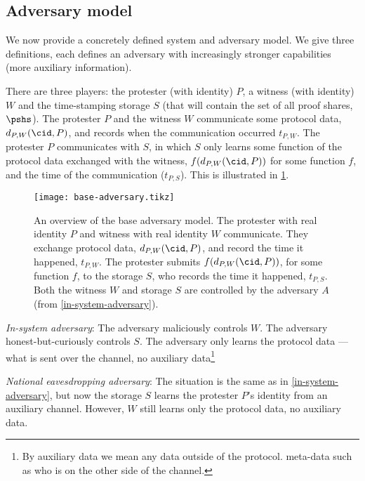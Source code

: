 \subsection{Adversary model}%
\label{formal-adversary-model}

We now provide a concretely defined system and adversary model.
We give three definitions, each defines an adversary with increasingly stronger 
capabilities (\ie more auxiliary information).

There are three players: the protester (with identity) \(P\), a witness (with 
identity) \(W\) and the time-stamping storage \(S\) (that will contain the set 
of all proof shares, \(\pshs\)).
The protester \(P\) and the witness \(W\) communicate some protocol data,
\(d_{P,W}(\cid, P)\), and records when the communication occurred \(t_{P,W}\).
The protester \(P\) communicates with \(S\), in which \(S\) only learns some 
function of the protocol data exchanged with the witness, \(f(d_{P,W}(\cid, 
  P))\) for some function \(f\), and the time of the communication 
(\(t_{P,S}\)).
This is illustrated in \cref{fig:base-adversary}.

\begin{figure}
  \centering
  \texttt{[image: base-adversary.tikz]}
  \caption{\label{fig:base-adversary}%
    An overview of the base adversary model.
    The protester with real identity \(P\) and witness with real identity \(W\) 
    communicate.
    They exchange protocol data, \(d_{P,W}(\cid, P)\), and record the time it 
    happened, \(t_{P,W}\).
    The protester submits \(f(d_{P,W}(\cid, P))\), for some function \(f\), to 
    the storage \(S\), who records the time it happened, \(t_{P,S}\).
    Both the witness \(W\) and storage \(S\) are controlled by the adversary 
    \(A\) (from \cref{in-system-adversary}).
  }
\end{figure}

\begin{adversaries}
\item\label{in-system-adversary}
  \emph{In-system adversary}:
  The adversary maliciously controls \(W\).
  The adversary honest-but-curiously controls \(S\).
  The adversary only learns the protocol data --- \ie what is sent over the 
  channel, no auxiliary data\footnote{%
    By auxiliary data we mean any data outside of the protocol.
    \Eg meta-data such as who is on the other side of the channel.
  }

\item\label{deanonymizing-storage-adversary}
  \emph{National eavesdropping adversary}:
  The situation is the same as in \cref{in-system-adversary}, but now the storage 
  \(S\) learns the protester \(P\)'s identity from an auxiliary channel.
  However, \(W\) still learns only the protocol data, no auxiliary data.

\end{adversaries}


